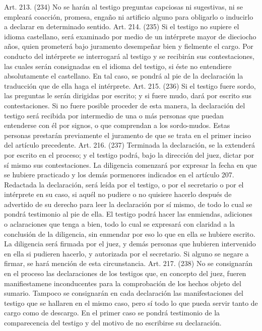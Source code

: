     Art. 213. (234) No se harán al testigo preguntas capciosas ni sugestivas, ni se empleará coacción, promesa, engaño ni artificio alguno para obligarlo o inducirlo a declarar en determinado sentido.
    Art. 214. (235) Si el testigo no supiere el idioma castellano, será examinado por medio de un intérprete mayor de dieciocho años, quien prometerá bajo juramento desempeñar bien y fielmente el cargo.
    Por conducto del intérprete se interrogará al testigo y se recibirán sus contestaciones, las cuales serán consignadas en el idioma del testigo, si éste no entendiere absolutamente el castellano. En tal caso, se pondrá al pie de la declaración la traducción que de ella haga el intérprete.
    Art. 215. (236) Si el testigo fuere sordo, las preguntas le serán dirigidas por escrito; y si fuere mudo, dará por escrito sus contestaciones.
    Si no fuere posible proceder de esta manera, la declaración del testigo será recibida por intermedio de una o más personas que puedan entenderse con él por signos, o que comprendan a los sordo-mudos. Estas personas prestarán previamente el juramento de que se trata en el primer inciso del artículo precedente.
    Art. 216. (237) Terminada la declaración, se la extenderá por escrito en el proceso; y el testigo podrá, bajo la dirección del juez, dictar por sí mismo sus contestaciones.
    La diligencia comenzará por expresar la fecha en que se hubiere practicado y los demás pormenores indicados en el artículo 207.
    Redactada la declaración, será leída por el testigo, o por el secretario o por el intérprete en su caso, si aquél no pudiere o no quisiere hacerlo después de advertido de su derecho para leer la declaración por sí mismo, de todo lo cual se pondrá testimonio al pie de ella.
    El testigo podrá hacer las enmiendas, adiciones o aclaraciones que tenga a bien, todo lo cual se expresará con claridad a la conclusión de la diligencia, sin enmendar por eso lo que en ella se hubiere escrito.
    La diligencia será firmada por el juez, y demás personas que hubieren intervenido en ella si pudieren hacerlo, y autorizada por el secretario. Si alguno se negare a firmar, se hará mención de esta circunstancia.
    Art. 217. (238) No se consignarán en el proceso las declaraciones de los testigos que, en concepto del juez, fueren manifiestamene inconducentes para la comprobación de los hechos objeto del sumario. Tampoco se consignarán en cada declaración las manifestaciones del testigo que se hallaren en el mismo caso, pero sí todo lo que pueda servir tanto de cargo como de descargo.
    En el primer caso se pondrá testimonio de la comparecencia del testigo y del motivo de no escribirse su declaración.

